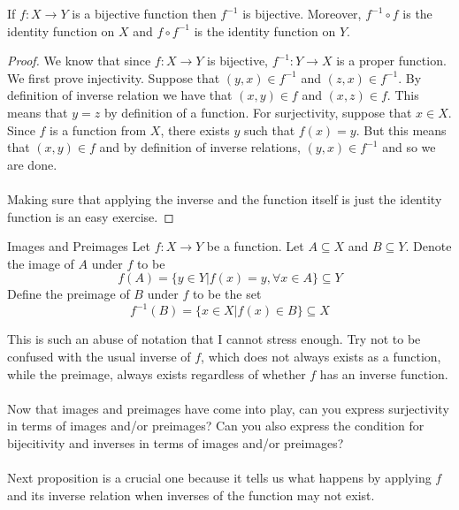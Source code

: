 \begin{prp}{}{} If $f:X\to Y$ is a bijective function then $f^{-1}$ is bijective. Moreover, $f^{-1}\circ f$ is the identity function on $X$ and $f\circ f^{-1}$ is the identity function on $Y$. \tcbline
\begin{proof}
We know that since $f:X\to Y$ is bijective, $f^{-1}:Y\to X$ is a proper function. We first prove injectivity. Suppose that $(y,x)\in f^{-1}$ and $(z,x)\in f^{-1}$. By definition of inverse relation we have that $(x,y)\in f$ and $(x,z)\in f$. This means that $y=z$ by definition of a function. For surjectivity, suppose that $x\in X$. Since $f$ is a function from $X$, there exists $y$ such that $f(x)=y$. But this means that $(x,y)\in f$ and by definition of inverse relations, $(y,x)\in f^{-1}$ and so we are done. \\~\\
Making sure that applying the inverse and the function itself is just the identity function is an easy exercise. 
\end{proof}
\end{prp}

\begin{defn}{Images and Preimages}{} Let $f:X\to Y$ be a function. Let $A\subseteq X$ and $B\subseteq Y$. Denote the image of $A$ under $f$ to be $$f(A)=\{y\in Y|f(x)=y,\forall x\in A\}\subseteq Y$$
Define the preimage of $B$ under $f$ to be the set $$f^{-1}(B)=\{x\in X|f(x)\in B\}\subseteq X$$
\end{defn}

This is such an abuse of notation that I cannot stress enough. Try not to be confused with the usual inverse of $f$, which does not always exists as a function, while the preimage, always exists regardless of whether $f$ has an inverse function. \\~\\

Now that images and preimages have come into play, can you express surjectivity in terms of images and/or preimages? Can you also express the condition for bijecitivity and inverses in terms of images and/or preimages? \\~\\

Next proposition is a crucial one because it tells us what happens by applying $f$ and its inverse relation when inverses of the function may not exist. 

